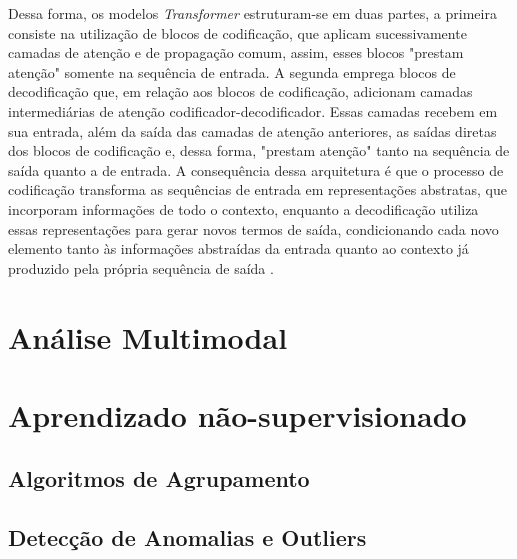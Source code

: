 Dessa forma, os modelos \textit{Transformer} estruturam-se em duas partes, a primeira consiste na utilização de blocos de codificação, que aplicam sucessivamente camadas de atenção e de propagação comum, assim, esses blocos "prestam atenção" somente na sequência de entrada. A segunda emprega blocos de decodificação que, em relação aos blocos de codificação, adicionam camadas intermediárias de atenção codificador-decodificador. Essas camadas recebem em sua entrada, além da saída das camadas de atenção anteriores, as saídas diretas dos blocos de codificação e, dessa forma, "prestam atenção" tanto na sequência de saída quanto a de entrada. A consequência dessa arquitetura é que o processo de codificação transforma as sequências de entrada em representações abstratas, que incorporam informações de todo o contexto, enquanto a decodificação utiliza essas representações para gerar novos termos de saída, condicionando cada novo elemento tanto às informações abstraídas da entrada quanto ao contexto já produzido pela própria sequência de saída \cite{transformer}.

\section{Análise Multimodal}



\section{Aprendizado não-supervisionado}





\subsection{Algoritmos de Agrupamento}



\subsection{Detecção de Anomalias e Outliers}